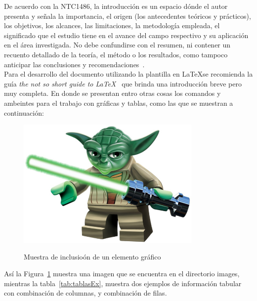 

De acuerdo con la NTC1486, la introducción es un espacio dónde el autor presenta y señala la importancia, el origen (los antecedentes teóricos y prácticos), los objetivos, los alcances, las limitaciones, la metodología empleada, el significado que el estudio tiene en el avance del campo respectivo y su aplicación en el área investigada. No debe confundirse con el resumen, ni contener un recuento detallado de la teoría, el método o los resultados, como tampoco anticipar las conclusiones y recomendaciones~\cite{NTC14862008}.\\

Para el desarrollo del documento utilizando la plantilla en \LaTeX se recomienda la guía \textit{the not so short guide to \LaTeX}~\cite{Oetiker2016} que brinda una introducci\'on breve pero muy completa. En donde se presentan entro otras cosas los comandos y ambeintes para el trabajo con gr\'aficas y tablas, como las que se muestran a continuaci\'on:

\begin{figure}[htbp!]
    \caption{Muestra de inclusio\'on de un elemento gr\'afico}
    \centering
    \includegraphics[width=0.8\textwidth]{Images/ImagenYoda.jpg}
    \label{fig:yoda}
\end{figure}

As\'i la Figura~\ref{fig:yoda} muestra una imagen que se encuentra en el directorio images, mientras la tabla~\ref{tab:tablasEx}, muestra dos ejemplos de información tabular con combinaci\'on de columnas, y combinaci\'on de filas.

